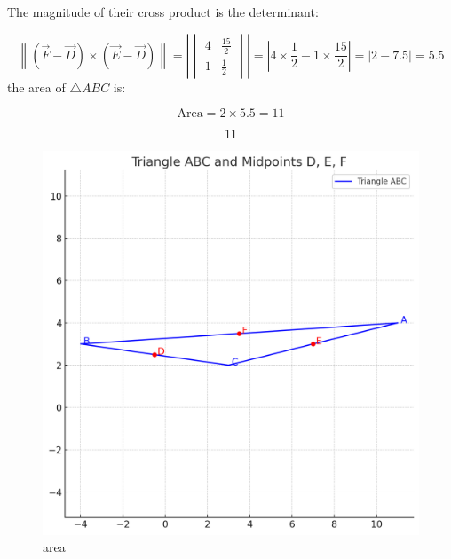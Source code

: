 \documentclass[journal]{IEEEtran}
\begin{document}
The magnitude of their cross product is the determinant:

\[
\left\| (\vec{F} - \vec{D}) \times (\vec{E} - \vec{D}) \right\| = 
\left|
\begin{vmatrix}
4 & \frac{15}{2} \\
1 & \frac{1}{2}
\end{vmatrix}
\right| = \left| 4 \times \frac{1}{2} - 1 \times \frac{15}{2} \right| = |2 - 7.5| = 5.5
\]
 the area of \(\triangle ABC\) is:

\[
\text{Area} = 2 \times 5.5 = 11
\]

\[
\boxed{11}
\]

\begin{figure}
    \centering
    \includegraphics[width=1\linewidth]{figs/area.png}
    \caption{area}
    \label{fig:placeholder}
\end{figure}
\end{document}

